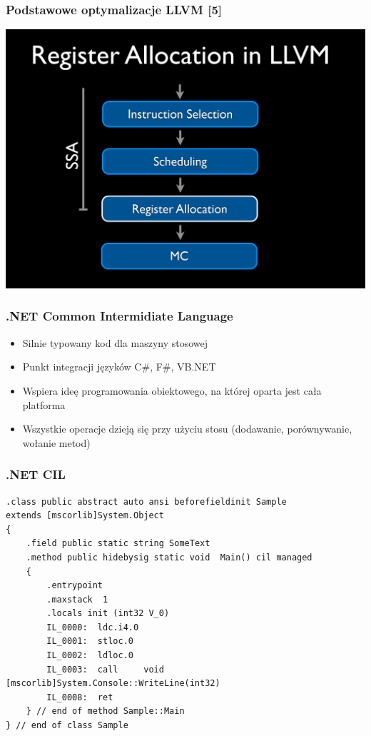 \documentclass{beamer}
\begin{document}
	\begin{frame}
		\frametitle{Podstawowe optymalizacje LLVM [5]}
		\includegraphics[width=\textwidth]{llvm.png}
	\end{frame}

	\begin{frame}
		\frametitle{.NET Common Intermidiate Language}
		\begin{itemize}
			\item Silnie typowany kod dla maszyny stosowej
			\item Punkt integracji języków C\#, F\#, VB.NET
			\item Wspiera ideę programowania obiektowego, na której oparta jest cała platforma
			\item Wszystkie operacje dzieją się przy użyciu stosu (dodawanie, porównywanie, wołanie metod)
		\end{itemize}
	\end{frame}

	\begin{frame}[fragile]
		\frametitle{.NET CIL}
		\begin{lstlisting}[language=CIL]
.class public abstract auto ansi beforefieldinit Sample
extends [mscorlib]System.Object
{
	.field public static string SomeText
	.method public hidebysig static void  Main() cil managed
	{
		.entrypoint
		.maxstack  1
		.locals init (int32 V_0)
		IL_0000:  ldc.i4.0
		IL_0001:  stloc.0
		IL_0002:  ldloc.0
		IL_0003:  call     void [mscorlib]System.Console::WriteLine(int32)
		IL_0008:  ret
	} // end of method Sample::Main
} // end of class Sample
		\end{lstlisting}
	\end{frame}
\end{document}
